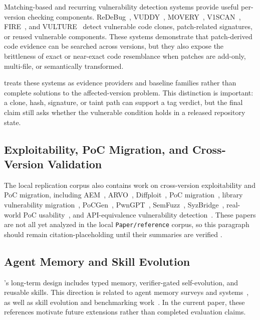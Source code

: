 Matching-based and recurring vulnerability detection systems provide useful per-version checking components. ReDeBug~\cite{redebug2012}, VUDDY~\cite{vuddy2017}, MOVERY~\cite{movery2022}, V1SCAN~\cite{v1scan2023}, FIRE~\cite{fire2024}, and VULTURE~\cite{vulture2025} detect vulnerable code clones, patch-related signatures, or reused vulnerable components. These systems demonstrate that patch-derived code evidence can be searched across versions, but they also expose the brittleness of exact or near-exact code resemblance when patches are add-only, multi-file, or semantically transformed.

\toolname treats these systems as evidence providers and baseline families rather than complete solutions to the affected-version problem. This distinction is important: a clone, hash, signature, or taint path can support a tag verdict, but the final claim still asks whether the vulnerable condition holds in a released repository state.

\subsection{Exploitability, PoC Migration, and Cross-Version Validation}

The local replication corpus also contains work on cross-version exploitability and PoC migration, including AEM~\cite{aem2023}, ARVO~\cite{arvo2024}, Diffploit~\cite{diffploit2025}, PoC migration~\cite{pocmigration2021}, library vulnerability migration~\cite{libmigration2024}, PoCGen~\cite{pocgen2025}, PwnGPT~\cite{pwngpt2025}, SemFuzz~\cite{semfuzz2017}, SyzBridge~\cite{syzbridge2024}, real-world PoC usability~\cite{pocusability2025}, and API-equivalence vulnerability detection~\cite{functionalityapi2025}. These papers are not all yet analyzed in the local \texttt{Paper/reference} corpus, so this paragraph should remain citation-placeholding until their summaries are verified .

\subsection{Agent Memory and Skill Evolution}

\toolname's long-term design includes typed memory, verifier-gated self-evolution, and reusable skills. This direction is related to agent memory surveys and systems~\cite{agentmemorysurvey2025,memps2025,memskill2026,agentsofchange2025}, as well as skill evolution and benchmarking work~\cite{autoskill2026,coevo2026,skillrl2026,skillsbench2026,trace2skill2026}. In the current paper, these references motivate future extensions rather than completed evaluation claims.

